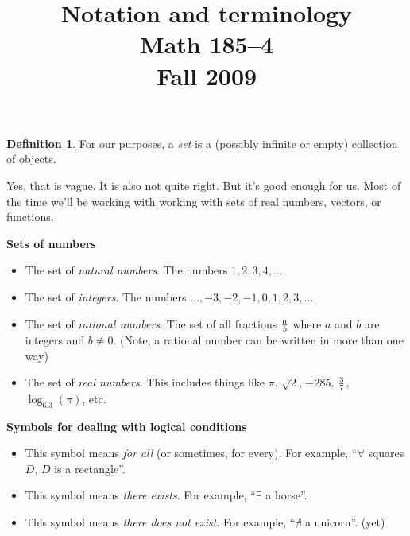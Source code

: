 \documentclass[11pt]{amsart}
\newcommand{\bR}{\mathbb{R}}
\newcommand{\bN}{\mathbb{N}}
\newcommand{\bQ}{\mathbb{Q}}
\newcommand{\bZ}{\mathbb{Z}}
\theoremstyle{definition}
\newtheorem{definition}[theorem]{Definition}
\theoremstyle{remark}
\begin{document}
\title{Notation and terminology\\Math 185--4\\Fall 2009}
\maketitle

\begin{definition}  For our purposes, a \emph{set} is a (possibly infinite or empty) collection of objects.  
\end{definition}

Yes, that is vague.  It is also not quite right.  But it's good enough for us.  Most of the time we'll be working with working with sets of real numbers, vectors, or functions.  

{\bf Sets of numbers}
\begin{itemize}
 \item[$\bN$]  The set of \emph{natural numbers}.  The numbers $1, 2, 3, 4, \ldots$
 \item[$\bZ$]  The set of \emph{integers}.  The numbers $\ldots, -3, -2, -1, 0, 1, 2, 3, \ldots$
 \item[$\bQ$]  The set of \emph{rational numbers}.  The set of all fractions ${a \over b}$ where $a$ and $b$ are integers and $b \neq 0$.  (Note, a rational number can be written in more than one way)
 \item[$\bR$]  The set of \emph{real numbers}.  This includes things like $\pi$, $\sqrt{2}$, $-285$, ${3 \over 7}$, $\log_6.3(\pi)$, etc.
\end{itemize}

{\bf Symbols for dealing with logical conditions}
\begin{itemize}
 \item[$\forall$]  This symbol means \emph{for all} (or sometimes, for every).  For example, ``$\forall$ squares $D$, $D$ is a rectangle''.
 \item[$\exists$]  This symbol means \emph{there exists}.  For example, ``$\exists$ a horse''.
 \item[$\nexists$]  This symbol means \emph{there does not exist}.  For example, ``$\nexists$ a unicorn''.  (yet)
\end{itemize}
\end{document}
